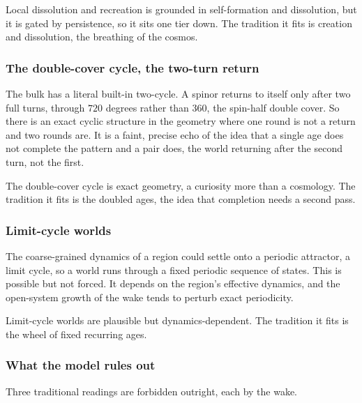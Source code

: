 \begin{result}
Local dissolution and recreation is grounded in self-formation and dissolution, but it is gated by persistence, so it sits one tier down. The tradition it fits is creation and dissolution, the breathing of the cosmos.
\end{result}

\subsubsection{The double-cover cycle, the two-turn return}

The bulk has a literal built-in two-cycle. A spinor returns to itself only after two full turns, through $720$ degrees rather than $360$, the spin-half double cover. So there is an exact cyclic structure in the geometry where one round is not a return and two rounds are. It is a faint, precise echo of the idea that a single age does not complete the pattern and a pair does, the world returning after the second turn, not the first.

\begin{result}
The double-cover cycle is exact geometry, a curiosity more than a cosmology. The tradition it fits is the doubled ages, the idea that completion needs a second pass.
\end{result}

\subsubsection{Limit-cycle worlds}

The coarse-grained dynamics of a region could settle onto a periodic attractor, a limit cycle, so a world runs through a fixed periodic sequence of states. This is possible but not forced. It depends on the region's effective dynamics, and the open-system growth of the wake tends to perturb exact periodicity.

\begin{result}
Limit-cycle worlds are plausible but dynamics-dependent. The tradition it fits is the wheel of fixed recurring ages.
\end{result}

\subsubsection{What the model rules out}

Three traditional readings are forbidden outright, each by the wake.

